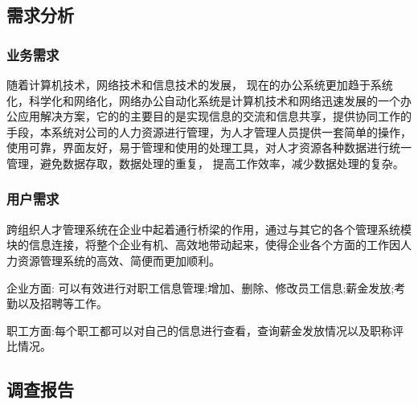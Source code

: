 \documentclass[UTF8]{ctexart}
\begin{document}
\subsection{需求分析}
\subsubsection{业务需求}
随着计算机技术，网络技术和信息技术的发展， 现在的办公系统更加趋于系统化，科学化和网络化，网络办公自动化系统是计算机技术和网络迅速发展的一个办公应用解决方案，它的的主要目的是实现信息的交流和信息共享，提供协同工作的手段，本系统对公司的人力资源进行管理，为人才管理人员提供一套简单的操作，使用可靠，界面友好，易于管理和使用的处理工具，对人才资源各种数据进行统一管理，避免数据存取，数据处理的重复， 提高工作效率，减少数据处理的复杂。
\subsubsection{用户需求}
跨组织人才管理系统在企业中起着通行桥梁的作用，通过与其它的各个管理系统模块的信息连接，将整个企业有机、高效地带动起来，使得企业各个方面的工作因人力资源管理系统的高效、简便而更加顺利。

企业方面: 可以有效进行对职工信息管理;增加、删除、修改员工信息;薪金发放;考勤以及招聘等工作。

职工方面:每个职工都可以对自己的信息进行查看，查询薪金发放情况以及职称评比情况。

\subsection{调查报告}
\end{document}
